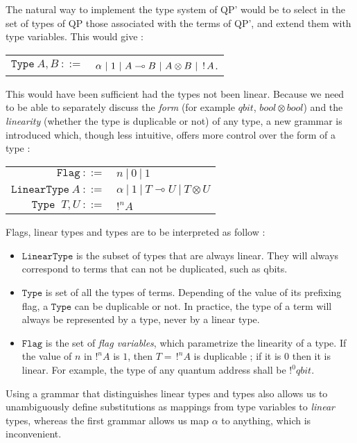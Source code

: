 \begin{defn} The natural way to implement the type system of QP' would be to select in the set of types of QP those associated with the
	terms of QP', and extend them with type variables. This would give :
		\begin{center}
		\begin{tabular}{rl}
			$\texttt{Type} ~A,B~ ::=$ & $\alpha ~|~ 1 ~|~ A \multimap B ~|~ A \otimes B ~|~ \,!\, A$.
		\end{tabular}
		\end{center}
	This would have been sufficient had the types not been linear. Because we need to be able to separately discuss the \textit{form} (for example
	$qbit$, $bool \otimes bool$) and the \textit{linearity} (whether the type is duplicable or not) of any type, a new grammar is introduced
	which, though less intuitive, offers more control over the form
	of a type :
		\begin{center}
		\begin{tabular}{rl}
			$\texttt{Flag}~ ::=$ & $n ~|~ 0 ~|~ 1$ \\		
			$\texttt{LinearType} ~A~ ::=$ & $\alpha ~|~ 1 ~|~ T \multimap U ~|~ T \otimes U$ \\
			$\texttt{Type	} ~T,U~ ::=$ & $!^n A$
		\end{tabular}
		\end{center}
	Flags, linear types and types are to be interpreted as follow :
		\begin{itemize}
			\item $\texttt{LinearType}$ is the subset of types that are always linear. They will always correspond to terms that can not be duplicated,
				such as qbits.
			\item $\texttt{Type}$ is set of all the types of terms. Depending of the value of its prefixing flag, a $\texttt{Type}$ can be duplicable or not.
				In practice, the type of a term will always be represented by a type, never by a linear type.
			\item $\texttt{Flag}$ is the set of \textit{flag variables}, which parametrize the linearity of a type. If the value of $n$ in
				$!^n A$ is $1$, then $T = \,!^n A$ is duplicable ; if it is $0$ then it is linear. For example, the type of any quantum address shall be
				$!^0 qbit$.
		\end{itemize}
	
	Using a grammar that distinguishes linear types and types also allows us to unambiguously define substitutions as mappings from type
	variables to \textit{linear} types, whereas the first grammar allows us map $\alpha$ to anything, which is inconvenient.	
\end{defn}

